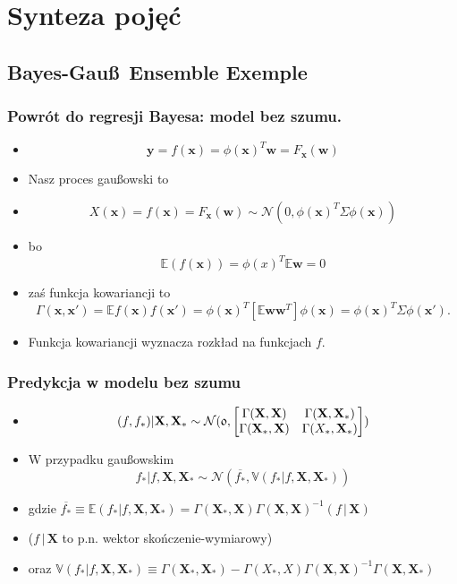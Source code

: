 \documentclass[draft, xetex]{beamer}
\newcommand{\xxx}{\mathbf{x}}
\newcommand{\www}{\mathbf{w}}
\newcommand{\yyy}{\mathbf{y}}
\newcommand{\X}{\mathbf{X}}
\begin{document}
\section[Synteza]{Synteza pojęć}

\subsection[Przykład kontynuowany]{Bayes-Gau\ss \,\,\,Ensemble Exemple}

\begin{frame}
	\frametitle{Powrót do regresji Bayesa: model bez szumu.}
	\begin{itemize}
		\item $$\yyy = f(\xxx) = \phi(\xxx)^T \www = F_{\xxx}(\www)$$
		\item Nasz proces gau\ss owski to
		\item $$X(\xxx) = f(\xxx) = F_{\xxx}(\www) \sim \mathcal{N}(\mathfrak{0}, \phi(\xxx)^T \Sigma \phi(\xxx))$$
		\item bo $$\mathbb{E}(f(\xxx)) = \phi(x)^T \mathbb{E} \www = \mathfrak{0}$$ 
		\item zaś funkcja kowariancji to $$\Gamma(\xxx, \xxx') = \mathbb{E}f(\xxx)f(\xxx') = \phi(\xxx)^T [\mathbb{E} \www \www^T] \phi(\xxx) = \phi(\xxx)^T \Sigma \phi(\xxx') .$$
		\item Funkcja kowariancji wyznacza rozkład na funkcjach $f$.
	\end{itemize}
\end{frame}

\begin{frame}
	\frametitle{Predykcja w modelu bez szumu}
	
	\begin{itemize}
		\item $$(f, f_*)|\X, \X_* \sim \mathcal{N}(\mathfrak{0}, \left [\begin{matrix}
		\Gamma(\X, \X) & \Gamma(\X, \X_*)\cr
		\Gamma(\X_*, \X) & \Gamma(X_*, \X_*)\cr
		\end{matrix} \right])$$
		
		\item W przypadku gau\ss owskim $$f_* | f, \X, \X_* \sim \mathcal{N}(\overline{f_*} , \mathbb{V}(f_*|f,\X,\X_*))$$
		\item gdzie $\overline{f_*} \equiv \mathbb{E}(f_*|f,\X,\X_*) = \Gamma(\X_*,\X)\Gamma(\X, \X)^{-1} (f \,|\,\X)$
		\item ($f \,|\,\X$ to p.n. wektor skończenie-wymiarowy)
		\item oraz $\mathbb{V}(f_*|f,\X,\X_*) \equiv \Gamma(\X_*, \X_*) - \Gamma(X_*, X)\Gamma(\X, \X)^{-1} \Gamma(\X, \X_*)$
	\end{itemize}
\end{frame}
\end{document}
